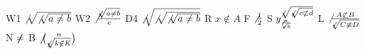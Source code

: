 \documentclass{article}
\begin{document}
W1 $\not\sqrt{\not\sqrt{a\not=b}}$ W2 $\not\frac{\not\sqrt{a\not=b}}{c}$
D4 $\not\sqrt{\not\sqrt{\not\sqrt{a\not=b}}}$ R $x\not\in A$ F $\not\frac{1}{2}$
S $y_{\not\frac{a}{\not\sqrt{b}}}^{\not\sqrt{\not\sqrt{c\not\subset d}}}$
L $\not\frac{A\not\subset B}{\not\sqrt{C\not\equiv D}}$ N $\not\not=$
B $\not\binom{n}{\not\sqrt{k\not\in K}}$
\end{document}
